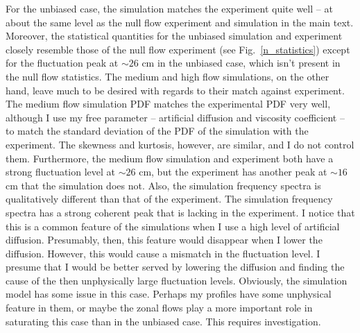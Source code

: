 For the unbiased case, the simulation matches the experiment quite well -- at about the same level as the null flow experiment and simulation in the main text. Moreover,
the statistical quantities for the unbiased simulation and experiment closely resemble those of the null flow experiment (see Fig.~\ref{n_statistics}) except for the fluctuation peak at $\sim 26$ cm
in the unbiased case, which isn't present in the null flow statistics.
The medium and high flow simulations, on the other hand, leave much to be desired with regards to their match against experiment. The medium flow simulation PDF matches the experimental PDF very well,
although I use my free parameter -- artificial diffusion and viscosity coefficient -- to match the standard deviation of the PDF of the simulation with the experiment. 
The skewness and kurtosis, however, are similar, and I do not control them.
Furthermore, the medium flow simulation and experiment both have a strong fluctuation level at $\sim 26$ cm, but the experiment has another peak at $\sim 16$ cm that the simulation does not.
Also, the simulation frequency spectra is qualitatively different than that of the experiment. 
The simulation frequency spectra has a strong coherent peak that is lacking in the experiment. I notice that this is
a common feature of the simulations when I use a high level of artificial diffusion. Presumably, then, this feature would disappear when I lower the diffusion. However, this would cause
a mismatch in the fluctuation level. I presume that I would be better served by lowering the diffusion and finding the cause of the then unphysically large fluctuation levels.
Obviously, the simulation model has some issue in this case. Perhaps my profiles have some unphysical feature in them, or maybe the zonal flows play a more
important role in saturating this case than in the unbiased case. This requires investigation.

